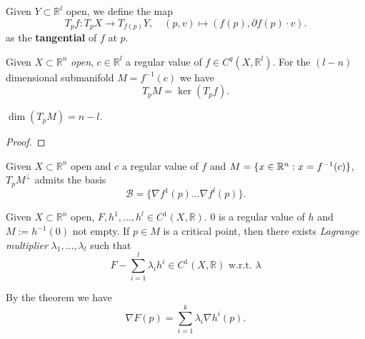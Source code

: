 \begin{definition}
	Given $Y \subset \mathbb{R}^l$ open, we define the map
	\begin{equation*}
		T_p f: T_pX \rightarrow T_{f(p)} Y, \quad (p, v) \mapsto (f(p), \partial f(p) \cdot v). 
	\end{equation*}
	as the \textbf{tangential} of $f$ at $p$. 
\end{definition}

\begin{theorem}
	Given $X \subset \mathbb{R}^n$ \textit{open}, $c \in \mathbb{R}^l$ a regular value of $f \in C^q(X, \mathbb{R}^l)$. For the $(l - n)$ dimensional submanifold $M = f^{-1}(c)$ we have 
	\begin{equation}
		T_p M = \ker (T_p f). 
	\end{equation}
\end{theorem}
\begin{remark}
$\dim (T_p M) = n - l$. 	
\end{remark}
\begin{proof}
\end{proof}

\begin{proposition}
	Given $X \subset \mathbb{R}^n$ open and $c$ a regular value of $f$ and $M = \{ x \in \mathbb{R}^n: x = f^{-1}(c)\}$,  $T_p M^\perp$ admits the basis
	\begin{equation}
		\mathcal{B} = \{ \nabla f^1(p) \dots \nabla f^l(p) \}. 
	\end{equation}
\end{proposition}


\begin{theorem}
	Given $X \subset \mathbb{R}^n$ open, $F, h^1, \dots, h^l \in C^1(X, \mathbb{R})$. 0 is a regular value of $h$ and $M:= h^{-1}(0)$ not empty. If $p \in M$ is a critical point, then there exists \textit{Lagrange multiplier} $\lambda_1 ,\dots, \lambda_l$ such that 
	\begin{equation}
		F - \sum_{i = 1}^l \lambda_i h^i \in C^1(X, \mathbb{R}) \text{ w.r.t. }\lambda
	\end{equation} 
\end{theorem}
\begin{remark}
By the theorem we have
\begin{equation}
	\nabla F(p) = \sum_{i = 1}^k \lambda_i \nabla h^i(p).
\end{equation}	
\end{remark}

